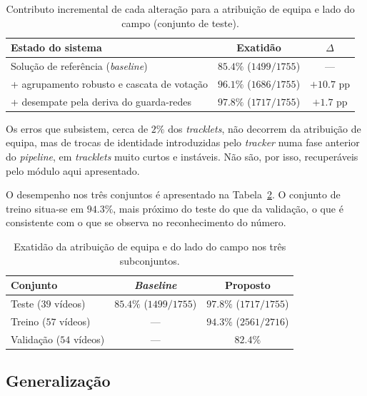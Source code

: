 \begin{table}[htbp]
    \centering
    \caption{Contributo incremental de cada alteração para a atribuição de equipa e lado do campo (conjunto de teste).}
    \label{tab:team-resultados}
    \begin{tabular}{lcc}
        \hline
        \textbf{Estado do sistema} & \textbf{Exatidão} & \textbf{$\Delta$} \\
        \hline
        Solução de referência (\emph{baseline})        & $85.4\%$ ($1499/1755$) & --- \\
        \; + agrupamento robusto e cascata de votação   & $96.1\%$ ($1686/1755$) & $+10.7$ pp \\
        \; + desempate pela deriva do guarda-redes      & $97.8\%$ ($1717/1755$) & $+1.7$ pp \\
        \hline
    \end{tabular}
\end{table}

Os erros que subsistem, cerca de $2\%$ dos \emph{tracklets}, não decorrem da atribuição de
equipa, mas de trocas de identidade introduzidas pelo \emph{tracker} numa fase anterior do
\emph{pipeline}, em \emph{tracklets} muito curtos e instáveis. Não são, por isso,
recuperáveis pelo módulo aqui apresentado.

O desempenho nos três conjuntos é apresentado na Tabela~\ref{tab:team-conjuntos}. O
conjunto de treino situa-se em $94.3\%$, mais próximo do teste do que da validação, o que é
consistente com o que se observa no reconhecimento do número.

\begin{table}[htbp]
    \centering
    \caption{Exatidão da atribuição de equipa e do lado do campo nos três subconjuntos.}
    \label{tab:team-conjuntos}
    \begin{tabular}{lcc}
        \hline
        \textbf{Conjunto} & \textit{\textbf{Baseline}} & \textbf{Proposto} \\
        \hline
        Teste ($39$ vídeos)     & $85.4\%$ ($1499/1755$) & $97.8\%$ ($1717/1755$) \\
        Treino ($57$ vídeos)    & ---                    & $94.3\%$ ($2561/2716$) \\
        Validação ($54$ vídeos) & ---                    & $82.4\%$ \\
        \hline
    \end{tabular}
\end{table}

\subsection{Generalização}
\label{sec:res_equipa_generalizacao}

